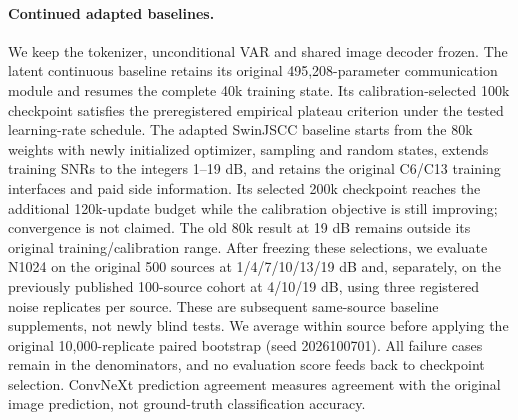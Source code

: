 \paragraph{Continued adapted baselines.}
We keep the tokenizer, unconditional VAR and shared image decoder frozen.
The latent continuous baseline retains its original 495,208-parameter communication
module and resumes the complete 40k training state. Its calibration-selected 100k
checkpoint satisfies the preregistered empirical plateau criterion under the tested
learning-rate schedule. The adapted SwinJSCC baseline starts from the 80k weights
with newly initialized optimizer, sampling and random states, extends training SNRs
to the integers 1--19 dB, and retains the original C6/C13 training interfaces and paid
side information. Its selected 200k checkpoint reaches the additional 120k-update
budget while the calibration objective is still improving; convergence is not claimed.
The old 80k result at 19 dB remains outside its original training/calibration range.
After freezing these selections, we evaluate N1024 on the original 500 sources at
1/4/7/10/13/19 dB and, separately, on the previously published 100-source cohort at
4/10/19 dB, using three registered noise replicates per source. These are subsequent
same-source baseline supplements, not newly blind tests. We average within source
before applying the original 10,000-replicate paired bootstrap (seed 2026100701).
All failure cases remain in the denominators, and no evaluation score feeds back
to checkpoint selection. ConvNeXt prediction agreement measures agreement with
the original image prediction, not ground-truth classification accuracy.
